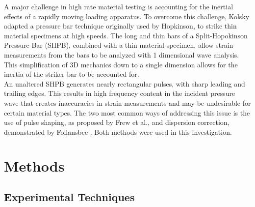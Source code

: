 \documentclass[12pt]{article}
\begin{document}
A major challenge in high rate material testing is accounting for the inertial effects of a rapidly moving loading apparatus. To overcome this challenge, Kolsky adapted a pressure bar technique originally used by Hopkinson, to strike thin material specimens at high speeds\cite{Kolsky}. The long and thin bars of a Split-Hopokinson Pressure Bar (SHPB), combined with a thin material specimen, allow strain measurements from the bars to be analyzed with 1 dimensional wave analysis. This simplification of 3D mechanics down to a single dimension allows for the inertia of the striker bar to be accounted for.\\

An unaltered SHPB generates nearly rectangular pulses, with sharp leading and trailing edges. This results in high frequency content in the incident pressure wave that creates inaccuracies in strain measurements and may be undesirable for certain material types. The two most common ways of addressing this issue is the use of pulse shaping, as proposed by Frew et al., and dispersion correction, demonstrated by Follansbee\cite{Frew2002} \cite{Follansbee}. Both methods were used in this investigation.  \\



\section{Methods}

\subsection{Experimental Techniques} 
\end{document}
